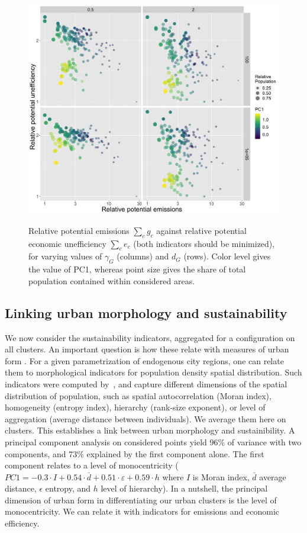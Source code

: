 \documentclass{jimis-en}
\begin{document}
\begin{figure}[!ht] 
  {\includegraphics[width=\linewidth]{Fig7.png}}
  \centering  
  \caption{Relative potential emissions $\sum_c g_c$ against relative potential economic unefficiency $\sum_c e_c$ (both indicators should be minimized), for varying values of $\gamma_G$ (columns) and $d_G$ (rows). Color level gives the value of PC1, whereas point size gives the share of total population contained within considered areas.\label{fig:paretos-relative}}
\end{figure}


\subsection{Linking urban morphology and sustainability}


We now consider the sustainability indicators, aggregated for a configuration on all clusters. An important question is how these relate with measures of urban form \citep{le2012urban}. For a given parametrization of endogenous city regions, one can relate them to morphological indicators for population density spatial distribution. Such indicators were computed by~\cite{raimbault2018calibration}, and capture different dimensions of the spatial distribution of population, such as spatial autocorrelation (Moran index), homogeneity (entropy index), hierarchy (rank-size exponent), or level of aggregation (average distance between individuals). We average them here on clusters. This establishes a link between urban morphology and sustainibility. A principal component analysis on considered points yield 96\% of variance with two components, and 73\% explained by the first component alone. The first component relates to a level of monocentricity ($PC1 = -0.3\cdot I + 0.54 \cdot \bar{d} + 0.51\cdot \varepsilon + 0.59 \cdot h$ where $I$ is Moran index, $\bar{d}$ average distance, $\epsilon$ entropy, and $h$ level of hierarchy). In a nutshell, the principal dimension of urban form in differentiating our urban clusters is the level of monocentricity. We can relate it with indicators for emissions and economic efficiency.
\end{document}
